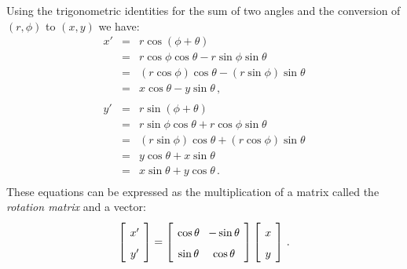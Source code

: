 
Using the trigonometric identities for the sum of two angles and the conversion of $(r,\phi)$ to $(x,y)$ we have:
\begin{eqnarray*}
x' &=& r\cos(\phi+\theta)\\
&=&r\cos\phi\cos\theta - r\sin\phi\sin\theta\\
&=&(r\cos\phi)\cos\theta - (r\sin\phi)\sin\theta\\
&=&x\cos\theta - y\sin\theta\,,\\
\\
y' &=& r\sin(\phi+\theta)\\
&=&r\sin\phi\cos\theta + r\cos\phi\sin\theta\\
&=&(r\sin\phi)\cos\theta + (r\cos\phi)\sin\theta\\
&=&y\cos\theta + x\sin\theta\\
&=&x\sin\theta + y\cos\theta\,.\\
\end{eqnarray*}
These equations can be expressed as the multiplication of a matrix called the \emph{rotation matrix} and a vector:
\[
\spacearray
\left[\begin{array}{c}x'\\y'\end{array}\right]=
\left[\begin{array}{cc}\cos\theta&-\sin\theta\\\sin\theta&\cos\theta\end{array}\right]
\left[\begin{array}{c}x\\y\end{array}\right]\,.
\]

